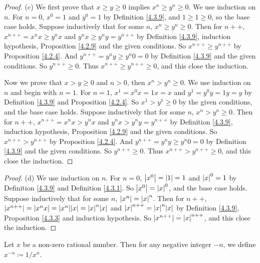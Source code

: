 \begin{proof}{(c)}
    We first prove that \(x \geq y \geq 0\) implies \(x^n \geq y^n \geq 0\).
    We use induction on \(n\).
    For \(n = 0\), \(x^0 = 1\) and \(y^0 = 1\) by Definition \ref{4.3.9}, and \(1 \geq 1 \geq 0\), so the base case holds.
    Suppose inductively that for some \(n\), \(x^n \geq y^n \geq 0\).
    Then for \(n++\), \(x^{n++} = x^n x \geq y^n x\) and \(y^n x \geq y^n y = y^{n++}\) by Definition \ref{4.3.9}, induction hypothesis, Proposition \ref{4.2.9} and the given conditions.
    So \(x^{n++} \geq y^{n++}\) by Proposition \ref{4.2.4}.
    And \(y^{n++} = y^n y \geq y^n 0 = 0\) by Definition \ref{4.3.9} and the given conditions.
    So \(y^{n++} \geq 0\).
    Thus \(x^{n++} \geq y^{n++} \geq 0\), and this close the induction.

    Now we prove that \(x > y \geq 0\) and \(n > 0\), then \(x^n > y^n \geq 0\).
    We use induction on \(n\) and begin with \(n = 1\).
    For \(n = 1\), \(x^1 = x^0 x = 1x = x\) and \(y^1 = y^0 y = 1y = y\) by Definition \ref{4.3.9} and Proposition \ref{4.2.4}.
    So \(x^1 > y^1 \geq 0\) by the given conditions, and the base case holds.
    Suppose inductively that for some \(n\), \(x^n > y^n \geq 0\).
    Then for \(n++\), \(x^{n++} = x^n x > y^n x\) and \(y^n x > y^n y = y^{n++}\) by Definition \ref{4.3.9}, induction hypothesis, Proposition \ref{4.2.9} and the given conditions.
    So \(x^{n++} > y^{n++}\) by Proposition \ref{4.2.4}.
    And \(y^{n++} = y^n y \geq y^n 0 = 0\) by Definition \ref{4.3.9} and the given conditions.
    So \(y^{n++} \geq 0\).
    Thus \(x^{n++} > y^{n++} \geq 0\), and this close the induction.
\end{proof}

\begin{proof}{(d)}
    We use induction on \(n\).
    For \(n = 0\), \(\abs*{x^0} = \abs*{1} = 1\) and \(\abs*{x}^0 = 1\) by Definition \ref{4.3.9} and Definition \ref{4.3.1}.
    So \(\abs*{x^0} = \abs*{x}^0\), and the base case holds.
    Suppose inductively that for some \(n\), \(\abs*{x^n} = \abs*{x}^n\).
    Then for \(n++\), \(\abs*{x^{n++}} = \abs*{x^n x} = \abs*{x^n}\abs*{x} = \abs*{x}^n \abs*{x}\) and \(\abs*{x}^{n++} = \abs*{x}^n \abs*{x}\) by Definition \ref{4.3.9}, Proposition \ref{4.3.3} and induction hypothesis.
    So \(\abs*{x^{n++}} = \abs*{x}^{n++}\), and this close the induction.
\end{proof}

\begin{definition}\label{4.3.11}
    Let \(x\) be a non-zero rational number.
    Then for any negative integer \(-n\), we define \(x^{-n} \coloneqq 1 / x^n\).
\end{definition}


